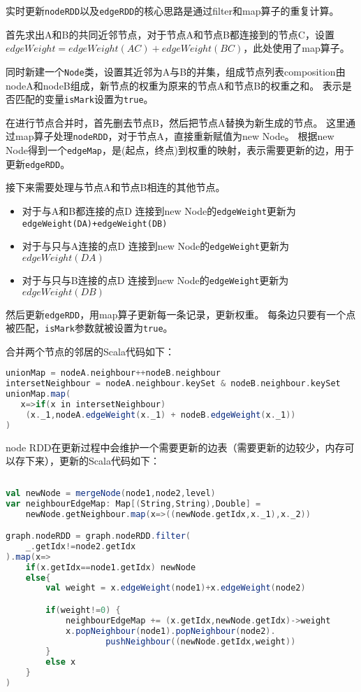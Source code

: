 实时更新\texttt{nodeRDD}以及\texttt{edgeRDD}的核心思路是通过filter和map算子的重复计算。

首先求出A和B的共同近邻节点，对于节点A和节点B都连接到的节点C，设置$edgeWeight=edgeWeight(AC)+edgeWeight(BC)$，此处使用了map算子。

同时新建一个\texttt{Node}类，设置其近邻为A与B的并集，组成节点列表composition由nodeA和nodeB组成，新节点的权重为原来的节点A和节点B的权重之和。
表示是否匹配的变量\texttt{isMark}设置为\texttt{true}。

在进行节点合并时，首先删去节点B，然后把节点A替换为新生成的节点。
这里通过map算子处理\texttt{nodeRDD}，对于节点A，直接重新赋值为new Node。
根据new Node得到一个\texttt{edgeMap}，是(起点，终点)到权重的映射，表示需要更新的边，用于更新\texttt{edgeRDD}。

接下来需要处理与节点A和节点B相连的其他节点。
\begin{itemize}
    \item 对于与A和B都连接的点D
        连接到new Node的\texttt{edgeWeight}更新为\texttt{edgeWeight(DA)+edgeWeight(DB)}
    \item 对于与只与A连接的点D
        连接到new Node的\texttt{edgeWeight}更新为$edgeWeight(DA)$
    \item 对于与只与B连接的点D
        连接到new Node的\texttt{edgeWeight}更新为$edgeWeight(DB)$
\end{itemize}

然后更新\texttt{edgeRDD}，用map算子更新每一条记录，更新权重。
每条边只要有一个点被匹配，\texttt{isMark}参数就被设置为\texttt{true}。

合并两个节点的邻居的Scala代码如下：

\begin{lstlisting}[language=Scala]
unionMap = nodeA.neighbour++nodeB.neighbour
intersetNeighbour = nodeA.neighbour.keySet & nodeB.neighbour.keySet
unionMap.map(
   x=>if(x in intersetNeighbour)
    (x._1,nodeA.edgeWeight(x._1) + nodeB.edgeWeight(x._1))
)
\end{lstlisting}

node RDD在更新过程中会维护一个需要更新的边表（需要更新的边较少，内存可以存下来），更新的Scala代码如下：

\begin{lstlisting}[language=Scala]
    
val newNode = mergeNode(node1,node2,level)
var neighbourEdgeMap: Map[(String,String),Double] =
    newNode.getNeighbour.map(x=>((newNode.getIdx,x._1),x._2))

graph.nodeRDD = graph.nodeRDD.filter(
    _.getIdx!=node2.getIdx
).map(x=>
    if(x.getIdx==node1.getIdx) newNode
    else{
        val weight = x.edgeWeight(node1)+x.edgeWeight(node2)

        if(weight!=0) {
            neighbourEdgeMap += (x.getIdx,newNode.getIdx)->weight
            x.popNeighbour(node1).popNeighbour(node2).
                    pushNeighbour((newNode.getIdx,weight))
        }
        else x
    }
)
\end{lstlisting}

